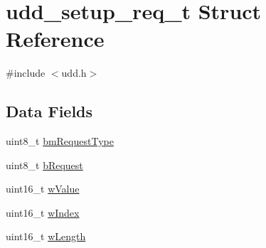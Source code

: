 \hypertarget{structudd__setup__req__t}{
\section{udd\-\_\-setup\-\_\-req\-\_\-t \-Struct \-Reference}
\label{structudd__setup__req__t}
}


{\ttfamily \#include $<$udd.\-h$>$}

\subsection*{\-Data \-Fields}
\begin{DoxyCompactItemize}
\item 
uint8\-\_\-t \hyperlink{structudd__setup__req__t_a40ec5987baf18ada7c852aa556102d51}{bm\-Request\-Type}
\item 
uint8\-\_\-t \hyperlink{structudd__setup__req__t_aa6d1f4b258b1b3ddb4eb446e17d0a258}{b\-Request}
\item 
uint16\-\_\-t \hyperlink{structudd__setup__req__t_a2957ed930c944745d809f4dd28d46fc4}{w\-Value}
\item 
uint16\-\_\-t \hyperlink{structudd__setup__req__t_aac97c21729d801db81853cd5bf45c953}{w\-Index}
\item 
uint16\-\_\-t \hyperlink{structudd__setup__req__t_a083a6f9b83f27aede156698631feb4f0}{w\-Length}
\end{DoxyCompactItemize}



